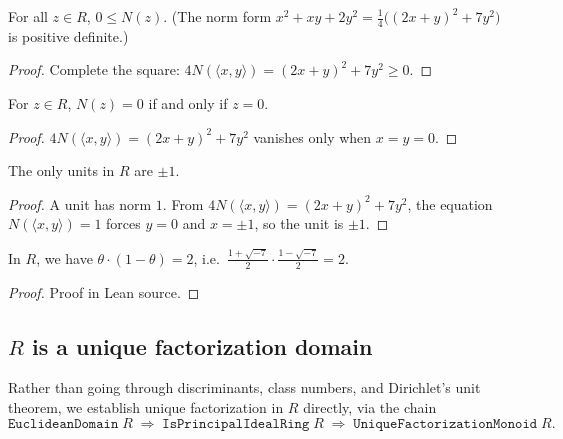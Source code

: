 \begin{lemma}
  \label{lem:norm_nonneg}
  \leanok
  For all $z \in R$, $0 \leq N(z)$. (The norm form
  $x^2 + xy + 2y^2 = \tfrac14\big((2x+y)^2 + 7y^2\big)$ is positive definite.)
\end{lemma}
\begin{proof}\leanok
  Complete the square: $4N(\langle x,y\rangle) = (2x+y)^2 + 7y^2 \geq 0$.
\end{proof}

\begin{lemma}
  \label{lem:norm_eq_zero_iff}
  \leanok
  For $z \in R$, $N(z) = 0$ if and only if $z = 0$.
\end{lemma}
\begin{proof}\leanok
  $4N(\langle x,y\rangle) = (2x+y)^2 + 7y^2$ vanishes only when $x = y = 0$.
\end{proof}

\begin{lemma}
  \label{lem:units_pm_one}
  \leanok
  The only units in $R$ are $\pm 1$.
\end{lemma}
\begin{proof}\leanok
  A unit has norm $1$. From $4N(\langle x,y\rangle) = (2x+y)^2 + 7y^2$, the
  equation $N(\langle x,y\rangle) = 1$ forces $y = 0$ and $x = \pm 1$, so the
  unit is $\pm 1$.
\end{proof}

\begin{lemma}[Factorization of $2$]
  \label{lem:two_factorisation_R}
  \leanok
  In $R$, we have $\theta \cdot (1 - \theta) = 2$, i.e.\
  $\frac{1+\sqrt{-7}}{2} \cdot \frac{1-\sqrt{-7}}{2} = 2$.
\end{lemma}
\begin{proof}\leanok
  Proof in Lean source.
\end{proof}

\subsection{$R$ is a unique factorization domain}

Rather than going through discriminants, class numbers, and Dirichlet's unit
theorem, we establish unique factorization in $R$ directly, via the chain
\[
  \texttt{EuclideanDomain}\;R \;\Longrightarrow\; \texttt{IsPrincipalIdealRing}\;R
  \;\Longrightarrow\; \texttt{UniqueFactorizationMonoid}\;R.
\]

